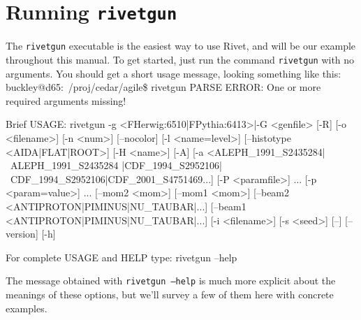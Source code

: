 \documentclass{JHEP3}
\newenvironment{snippet}{\Verbatim}{\endVerbatim}
\newcommand{\kbd}[1]{\texttt{#1}\xspace}
\newcommand{\inp}[1]{\textsf{\textdollar}\hspace{1mm}\texttt{#1}\xspace}
\begin{document}
\section{Running \kbd{rivetgun}}
\label{sec:rivetgun}
The \kbd{rivetgun} executable is the easiest way to use Rivet, and will be our
example throughout this manual. To get started, just run the command
\inp{rivetgun} with no arguments. You should get a short usage message, looking
something like this:
%
\begin{snippet}
buckley@d65:~/proj/cedar/agile\$ rivetgun
PARSE ERROR:  
             One or more required arguments missing!

Brief USAGE: 
   rivetgun  {-g <FHerwig:6510|FPythia:6413>|-G <genfile>} [-R] 
             [-o <filename>] [-n <num>] [--nocolor] [-l <name=level>] 
             [--histotype <AIDA|FLAT|ROOT>] [-H <name>]
             [-A] [-a <ALEPH_1991_S2435284|~ALEPH_1991_S2435284
             |CDF_1994_S2952106|~CDF_1994_S2952106|CDF_2001_S4751469...]
             [-P <paramfile>] ...  [-p <param=value>] ...  [--mom2 <mom>]
             [--mom1 <mom>] [--beam2 <ANTIPROTON|PIMINUS|NU_TAUBAR|...]
             [--beam1 <ANTIPROTON|PIMINUS|NU_TAUBAR|...]
             [-i <filename>] [-s <seed>] [--] [--version] [-h]

For complete USAGE and HELP type: 
   rivetgun --help
\end{snippet}

The message obtained with \kbd{rivetgun --help} is much more explicit about the
meanings of these options, but we'll survey a few of them here with concrete examples.
\end{document}

